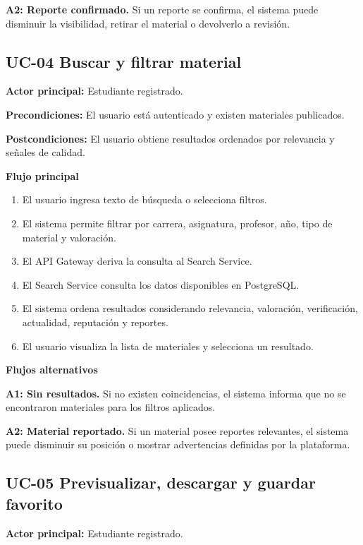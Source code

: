 \documentclass[12pt,a4paper]{article}
\begin{document}
\noindent\textbf{A2: Reporte confirmado.} Si un reporte se confirma, el sistema puede disminuir la visibilidad, retirar el material o devolverlo a revisión.

\subsection{UC-04 Buscar y filtrar material}

\noindent\textbf{Actor principal:} Estudiante registrado.

\noindent\textbf{Precondiciones:} El usuario está autenticado y existen materiales publicados.

\noindent\textbf{Postcondiciones:} El usuario obtiene resultados ordenados por relevancia y señales de calidad.

\noindent\textbf{Flujo principal}

\begin{enumerate}
    \item El usuario ingresa texto de búsqueda o selecciona filtros.
    \item El sistema permite filtrar por carrera, asignatura, profesor, año, tipo de material y valoración.
    \item El API Gateway deriva la consulta al Search Service.
    \item El Search Service consulta los datos disponibles en PostgreSQL.
    \item El sistema ordena resultados considerando relevancia, valoración, verificación, actualidad, reputación y reportes.
    \item El usuario visualiza la lista de materiales y selecciona un resultado.
\end{enumerate}

\noindent\textbf{Flujos alternativos}

\noindent\textbf{A1: Sin resultados.} Si no existen coincidencias, el sistema informa que no se encontraron materiales para los filtros aplicados.

\noindent\textbf{A2: Material reportado.} Si un material posee reportes relevantes, el sistema puede disminuir su posición o mostrar advertencias definidas por la plataforma.

\subsection{UC-05 Previsualizar, descargar y guardar favorito}

\noindent\textbf{Actor principal:} Estudiante registrado.
\end{document}
